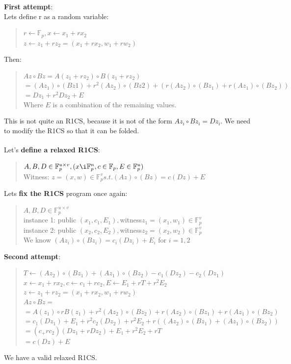\textbf{First attempt}:
\\
Lets define r as a random variable:
\begin{quote}
$r \leftarrow \mathbb{F}_p, x \leftarrow x_1+rx_2$
\\
$z \leftarrow z_1 + rz_2 = (x_1+rx_2, w_1 + rw_2)$
\end{quote}


Then:
\begin{quote}
   $Az \circ Bz = A(z_1 + r z_2) \circ B(z_1 + rz_2)$
   \\
   $= (Az_1) \circ (Bz1) + r^2 (Az_2) \circ (Bz2) + (r(Az_2) \circ (Bz_1) + r(Az_1) \circ (Bz_2))$
   \\
   $=Dz_1 + r^2Dz_2 + E$
   \\
   Where $E$ is a combination of the remaining values.
   \\
\end{quote}
This is not quite an R1CS, because it is not of the form $Az_i \circ Bz_i = Dz_i$.
We need to modify the R1CS so that it can be folded.
\\
\\
Let's \textbf{define a relaxed R1CS}:
\begin{quote}
$A, B,D \in \mathbb{F}^{u \times v}_p, (x \i  \mathbb{F}^n_p, c \in \mathbb{F}_p, E \in \mathbb{F}^u_p) $
\\
Witness: $ z = (x,w) \in \mathbb{F}^v_p s.t. (Az) \circ (Bz) = c(Dz) + E$
\end{quote}
Lets \textbf{fix the R1CS} program once again:
\begin{quote}
$A,B,D \in \mathbb{F}^{u \times v}_p $
\\
instance 1: public $ (x_1,c_1,E_1), $witness$ z_1 = (x_1, w_1) \in \mathbb{F}^v_p$
\\
instance 2: public $(x_2,c_2,E_2), $witness$  z_2 = (x_2, w_2) \in \mathbb{F}^v_p$
\\
We know $(Az_i) \circ (Bz_i) = c_i(Dz_i) + E_i$ for $ i = 1,2$
\end{quote}


\textbf{Second attempt}:
\begin{quote}
$T \leftarrow (Az_2) \circ (Bz_1) + (Az_1) \circ (Bz_2) - c_1(Dz_2) - c_2(Dz_1)$
\\
$x \leftarrow x_1 + rx_2, c \leftarrow c_1 + rc_2, E \leftarrow E_1 + rT +r^2E_2$
\\
$z \leftarrow z_1 + rz_2 = (x_1 +rx_2, w_1 + rw_2)$
\\
$Az \circ Bz = $
\\
$=A(z_1) \circ rB(z_1) +r^2(Az_2) \circ (Bz_2) + r(Az_2) \circ (Bz_1) + r(Az_1) \circ (Bz_2)$
\\
$=c_1(Dz_1) + E_1 + r^2c_2(Dz_2) + r^2E_2+r((Az_2) \circ (Bz_1) + (Az_1) \circ (Bz_2))$
\\
$=(c_+rc_2)(Dz_1+rDz_2)+E_1+r^2E_2+rT$
\\
$=c(Dz) + E$
\end{quote}
We have a valid relaxed R1CS.\cite{ZKM10} \cite{FG23}

